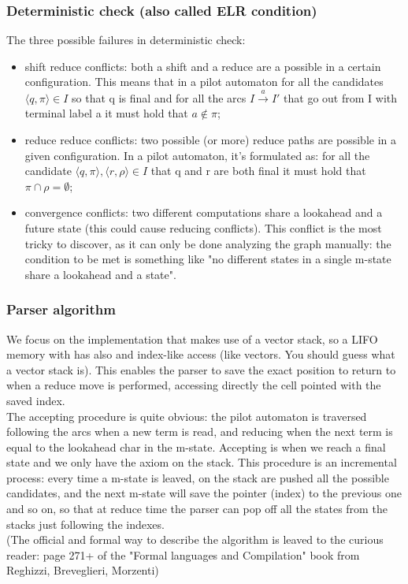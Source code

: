 			\subsubsection{Deterministic check (also called ELR condition)}	
				The three possible failures in deterministic check:
				\begin{itemize}
					\item shift reduce conflicts: both a shift and a reduce are a possible in a certain configuration. This means that in a pilot automaton for all the candidates $\langle q, \pi \rangle \in I$ so that q is final and for all the arcs $I \xrightarrow{a} I'$ that go out from I with terminal label a it must hold that $a \notin \pi$;
					\item reduce reduce conflicts: two possible (or more) reduce paths are possible in a given configuration. In a pilot automaton, it's formulated as: for all the candidate $\langle q, \pi \rangle, \langle r, \rho \rangle \in I$ that q and r are both final it must hold that $\pi \cap \rho = \emptyset$;
					\item convergence conflicts: two different computations share a lookahead and a future state (this could cause reducing conflicts). This conflict is the most tricky to discover, as it can only be done analyzing the graph manually: the condition to be met is something like "no different states in a single m-state share a lookahead and a state".
				\end{itemize}
				
			\subsubsection{Parser algorithm}
				We focus on the implementation that makes use of a vector stack, so a LIFO memory with has also and index-like access (like vectors. You should guess what a vector stack is). This enables the parser to save the exact position to return to when a reduce move is performed, accessing directly the cell pointed with the saved index.\\
				The accepting procedure is quite obvious: the pilot automaton is traversed following the arcs when a new term is read, and reducing when the next term is equal to the lookahead char in the m-state. Accepting is when we reach a final state and we only have the axiom on the stack. This procedure is an incremental process: every time a m-state is leaved, on the stack are pushed all the possible candidates, and the next m-state will save the pointer (index) to the previous one and so on, so that at reduce time the parser can pop off all the states from the stacks just following the indexes.\\
				(The official and formal way to describe the algorithm is leaved to the curious reader: page 271+ of the "Formal languages and Compilation" book from Reghizzi, Breveglieri, Morzenti)
			
